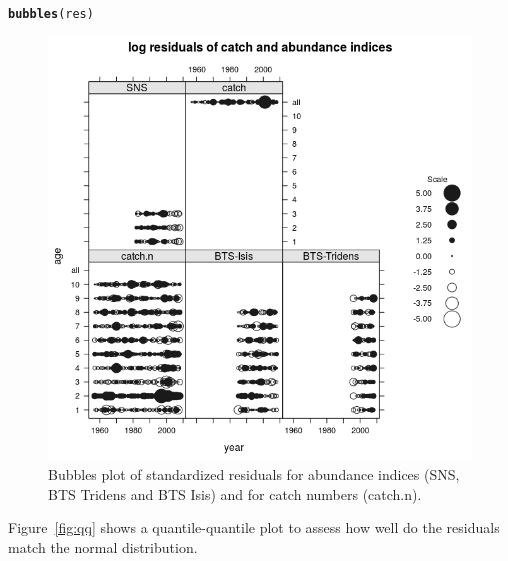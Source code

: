 \documentclass[a4paper,english,10pt]{article}\usepackage[]{graphicx}\usepackage[]{color}
\makeatletter
\def\maxwidth{ %
  \ifdim\Gin@nat@width>\linewidth
    \linewidth
  \else
    \Gin@nat@width
  \fi
}
\newcommand{\hlstd}[1]{\textcolor[rgb]{0.345,0.345,0.345}{#1}}%
\newcommand{\hlkwd}[1]{\textcolor[rgb]{0.737,0.353,0.396}{\textbf{#1}}}%
\newenvironment{kframe}{%
 \def\at@end@of@kframe{}%
 \ifinner\ifhmode%
  \def\at@end@of@kframe{\end{minipage}}%
  \begin{minipage}{\columnwidth}%
 \fi\fi%
 \def\FrameCommand##1{\hskip\@totalleftmargin \hskip-\fboxsep
 \colorbox{shadecolor}{##1}\hskip-\fboxsep
     \hskip-\linewidth \hskip-\@totalleftmargin \hskip\columnwidth}%
 \MakeFramed {\advance\hsize-\width
   \@totalleftmargin\z@ \linewidth\hsize
   \@setminipage}}%
 {\par\unskip\endMakeFramed%
 \at@end@of@kframe}
\newenvironment{knitrout}{}{} %
\makeatother
\begin{document}
\begin{knitrout}
\color{fgcolor}\begin{kframe}
\begin{alltt}
\hlkwd{bubbles}\hlstd{(res)}
\end{alltt}
\end{kframe}\begin{figure}[H]

{\centering \includegraphics[width=\maxwidth]{figure/bub-1} 

}

\caption[Bubbles plot of standardized residuals for abundance indices (SNS, BTS Tridens and BTS Isis) and for catch numbers (catch.n)]{Bubbles plot of standardized residuals for abundance indices (SNS, BTS Tridens and BTS Isis) and for catch numbers (catch.n).}\label{fig:bub}
\end{figure}


\end{knitrout}

Figure~\ref{fig:qq} shows a quantile-quantile plot to assess how well do the residuals match the normal distribution.
\end{document}
